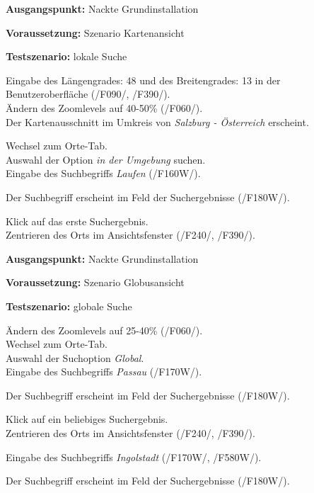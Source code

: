 \documentclass[10pt]{scrreprt}
\newcommand{\sfbf}[1]{\textbf{\sffamily #1}}
\newcommand{\ziel}[1]{{\fontsize{9.5}{11}\textsf{/#1/}}}
\newcommand{\ziellabel}{Z}
\newcommand{\wunsch}{\renewcommand{\labelenumi}{\textbf{\ziel{\ziellabel\numprint{\theenumi}0W}}}}
\newenvironment{details}[1][6pt]{%
  \parskip#1 \parindent6mm \raggedright%
  \def\item{\par\ignorespaces\hangindent=5mm \hangafter1}}{%
  \par\ignorespaces}
\begin{document}
\vspace{1.0cm}
\begin{details}[2pt]
\item \sfbf{Ausgangspunkt:} Nackte Grundinstallation 
\item \sfbf{Voraussetzung:} Szenario Kartenansicht
\item \sfbf{Testszenario:} lokale Suche
\end{details}
\vspace{2mm}
\begin{enumerate}[leftmargin = 2.2cm, resume]
\item Eingabe des Längengrades: 48 und des Breitengrades: 13 in der Benutzeroberfläche (\ziel{F090}, \ziel{F390}).\\Ändern des Zoomlevels auf 40-50\% (\ziel{F060}).\\Der Kartenausschnitt im Umkreis von \textit{Salzburg - Österreich} erscheint.
\wunsch
\item Wechsel zum Orte-Tab.\\Auswahl der Option \textit{in der Umgebung} suchen.\\Eingabe des Suchbegriffs \textit{Laufen} (\ziel{F160W}).
\item Der Suchbegriff erscheint im Feld der Suchergebnisse (\ziel{F180W}).
\item Klick auf das erste Suchergebnis.\\Zentrieren des Orts im Ansichtsfenster (\ziel{F240}, \ziel{F390}).
\end{enumerate}


\vspace{1.0cm}
\begin{details}[2pt]
\item \sfbf{Ausgangspunkt:} Nackte Grundinstallation 
\item \sfbf{Voraussetzung:} Szenario Globusansicht
\item \sfbf{Testszenario:} globale Suche
\end{details}
\vspace{2mm}
\begin{enumerate}[leftmargin = 2.2cm, resume]
\wunsch
\item Ändern des Zoomlevels auf 25-40\% (\ziel{F060}).\\Wechsel zum Orte-Tab.\\Auswahl der Suchoption \textit{Global}.\\Eingabe des Suchbegriffs \textit{Passau} (\ziel{F170W}).
\item Der Suchbegriff erscheint im Feld der Suchergebnisse (\ziel{F180W}).
\item Klick auf ein beliebiges Suchergebnis.\\Zentrieren des Orts im Ansichtsfenster (\ziel{F240}, \ziel{F390}).
\item Eingabe des Suchbegriffs \textit{Ingolstadt} (\ziel{F170W}, \ziel{F580W}).
\item Der Suchbegriff erscheint im Feld der Suchergebnisse (\ziel{F180W}).
\end{enumerate}
\end{document}
